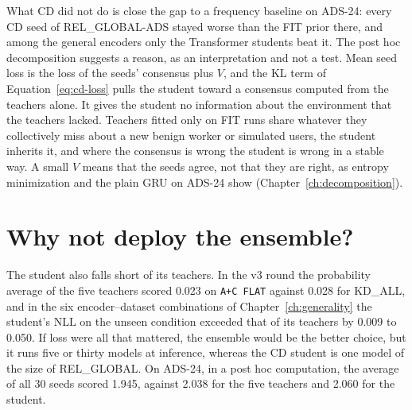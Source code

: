 What CD did not do is close the gap to a frequency baseline on ADS-24:
every CD seed of REL\_GLOBAL-ADS stayed worse than the FIT prior there,
and among the general encoders only the Transformer students beat it.
The post hoc decomposition suggests a reason, as an interpretation and
not a test. Mean seed loss is the loss of the
seeds' consensus plus $V$, and the KL term of
Equation~\ref{eq:cd-loss} pulls the student toward a consensus computed
from the teachers alone. It gives the student no information about the
environment that the teachers lacked. Teachers fitted only on FIT runs share whatever they collectively
miss about a new benign worker or simulated users, the student inherits
it, and where the consensus is wrong the student is wrong in a stable
way. A small
$V$ means that the seeds agree, not that they are right, as entropy
minimization and the plain GRU on ADS-24 show
(Chapter~\ref{ch:decomposition}).

\section{Why not deploy the ensemble?}
\label{sec:disc-ensemble}

The student also falls short of its teachers. In the v3 round the
probability average of the five teachers scored 0.023 on
\texttt{A+C FLAT} against 0.028 for KD\_ALL, and in the six
encoder--dataset combinations of Chapter~\ref{ch:generality} the
student's NLL on the unseen condition exceeded that of its teachers by
0.009 to 0.050. If loss were all that mattered, the ensemble would be
the better choice, but it runs five or thirty models at inference,
whereas the CD student is one model of the size of REL\_GLOBAL. On
ADS-24, in a post hoc computation, the average of all 30 seeds scored
1.945, against 2.038 for the five teachers and 2.060 for the student.

